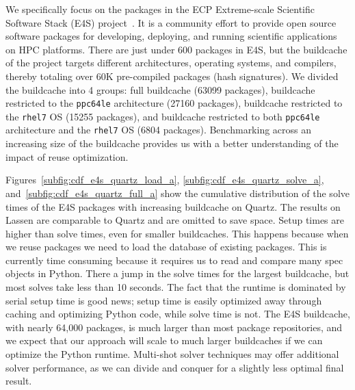 % 

We specifically focus on the packages in the ECP Extreme-scale Scientific Software Stack
(E4S) project~\cite{e4s}. It is a community effort to provide open source software
packages for developing, deploying, and running scientific applications on HPC
platforms. There are just under 600 packages in E4S, but the buildcache of the project
targets different architectures, operating systems, and compilers, thereby totaling over
60K pre-compiled packages (hash signatures). We divided the buildcache into 4 groups:
full buildcache (63099 packages), buildcache restricted to the \texttt{ppc64le}
architecture (27160 packages), buildcache restricted to the \texttt{rhel7} OS (15255
packages), and buildcache restricted to both \texttt{ppc64le} architecture and the
\texttt{rhel7} OS (6804 packages). Benchmarking across an increasing size of the
buildcache provides us with a better understanding of the impact of reuse optimization.


Figures~\ref{subfig:cdf_e4s_quartz_load_a}, \ref{subfig:cdf_e4s_quartz_solve_a},
and~\ref{subfig:cdf_e4s_quartz_full_a} show the cumulative distribution of the solve
times of the E4S packages with increasing buildcache on Quartz. The results on Lassen
are comparable to Quartz and are omitted to save space. Setup times are higher than
solve times, even for smaller buildcaches. This happens because when we reuse packages
we need to load the database of existing packages. This is currently time consuming
because it requires us to read and compare many spec objects in Python. There a jump in
the solve times for the largest buildcache, but most solves take less than 10 seconds.
The fact that the runtime is dominated by serial setup time is good news; setup time is
easily optimized away through caching and optimizing Python code, while solve
time is not. The E4S buildcache, with nearly 64,000 packages, is much larger than most
package repositories, and we expect that our approach will scale to much larger
buildcaches if we can optimize the Python runtime. Multi-shot solver techniques may
offer additional solver performance, as we can divide and conquer for a slightly less
optimal final result.

% 
